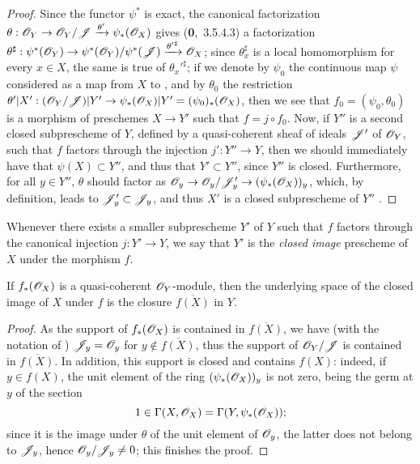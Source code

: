 \begin{proof}
Since the functor $\psi^*$ is exact, the canonical factorization
$\theta:\sh{O}_Y\to\sh{O}_Y/\sh{J}\xrightarrow{\theta'}\psi_*(\sh{O}_X)$ gives (\textbf{0},~3.5.4.3)
a factorization
$\theta^\sharp:\psi^*(\sh{O}_Y)\to\psi^*(\sh{O}_Y)/\psi^*(\sh{J})
  \xrightarrow{{\theta'}^\sharp}\sh{O}_X$; since $\theta_x^\sharp$ is a local homomorphism for
every $x\in X$, the same is true of ${\theta_x'}^\sharp$; if we denote by $\psi_0$ the
continuous map $\psi$ considered as a map from $X$ to , and by $\theta_0$ the restriction
$\theta'|X':(\sh{O}_Y/\sh{J})|Y'\to\psi_*(\sh{O}_X)|Y'=(\psi_0)_*(\sh{O}_X)$, then we see that
$f_0=(\psi_0,\theta_0)$ is a morphism of preschemes $X\to Y'$  such that
$f=j\circ f_0$. Now, if $Y''$ is
a second closed subprescheme of $Y$, defined by a quasi-coherent sheaf of ideals $\mathscr{J}'$ of
$\mathscr{O}_Y$, such that $f$ factors through the injection $j':Y''\to Y$, then we should
immediately have that $\psi(X)\subset Y''$, and thus that $Y'\subset Y''$, since $Y''$ is closed.
Furthermore, for all $y\in Y''$, $\theta$ should factor as
$\sh{O}_y\to\sh{O}_y/\sh{J}'_y\to(\psi_*(\sh{O}_X))_y$, which, by definition, leads to
$\mathscr{J}'_y\subset\mathscr{J}_y$, and thus $X'$ is a closed subprescheme of $Y''$
.
\end{proof}

\begin{definition}[9.5.3]
\label{I.9.5.3}
Whenever there exists a smaller subprescheme $Y'$ of $Y$ such that $f$ factors
through the canonical injection $j:Y'\to Y$, we say that $Y'$ is the
\emph{closed image} prescheme of $X$ under the morphism $f$.
\end{definition}

\begin{proposition}[9.5.4]
\label{I.9.5.4}
If $f_*(\mathscr{O}_X)$ is a quasi-coherent $\mathscr{O}_Y$-module, then the underlying space of
the closed image of $X$ under $f$ is the closure $\overline{f(X)}$ in $Y$.
\end{proposition}

\begin{proof}
As the support of $f_*(\mathscr{O}_X)$ is contained in $\overline{f(X)}$, we have (with
the notation of ) $\mathscr{J}_y=\mathscr{O}_y$ for
$y\not\in\overline{f(X)}$, thus the support of $\mathscr{O}_Y/\mathscr{J}$ is contained in
$\overline{f(X)}$. In addition, this support is closed and contains $f(X)$:
indeed, if $y\in f(X)$, the unit element of the ring $(\psi_*(\mathscr{O}_X))_y$ is not
zero, being the germ at $y$ of the section
\[
  1\in\Gamma(X,\mathscr{O}_X)=\Gamma(Y,\psi_*(\mathscr{O}_X));
\]
since it is the image under $\theta$ of the unit element of $\mathscr{O}_y$, the latter
does not belong to $\mathscr{J}_y$, hence $\mathscr{O}_y/\mathscr{J}_y\neq 0$; this finishes the
proof.
\end{proof}

